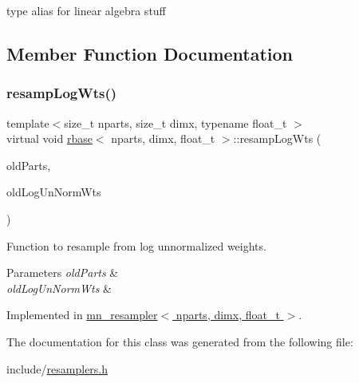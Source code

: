 type alias for linear algebra stuff 

\subsection{Member Function Documentation}
\mbox{\label{classrbase_aff0f6f88fd4656e67f5ebc870f10dd44}} 
\subsubsection{\texorpdfstring{resamp\+Log\+Wts()}{resampLogWts()}}
{\footnotesize\ttfamily template$<$size\+\_\+t nparts, size\+\_\+t dimx, typename float\+\_\+t $>$ \\
virtual void \hyperlink{classrbase}{rbase}$<$ nparts, dimx, float\+\_\+t $>$\+::resamp\+Log\+Wts (\begin{DoxyParamCaption}\item[{\hyperlink{classrbase_aa12fc826befa6ba0647b5f59ebc396ee}{array\+Vec} \&}]{old\+Parts,  }\item[{\hyperlink{classrbase_a6f76bef853e508cb5b6f546d231b06f5}{array\+Float} \&}]{old\+Log\+Un\+Norm\+Wts }\end{DoxyParamCaption})\hspace{0.3cm}{\ttfamily [pure virtual]}}



Function to resample from log unnormalized weights. 


\begin{DoxyParams}{Parameters}
{\em old\+Parts} & \\
\hline
{\em old\+Log\+Un\+Norm\+Wts} & \\
\hline
\end{DoxyParams}


Implemented in \hyperlink{classmn__resampler_a13b1897e180a791a3a099d5d6329a125}{mn\+\_\+resampler$<$ nparts, dimx, float\+\_\+t $>$}.



The documentation for this class was generated from the following file\+:\begin{DoxyCompactItemize}
\item 
include/\hyperlink{resamplers_8h}{resamplers.\+h}\end{DoxyCompactItemize}
